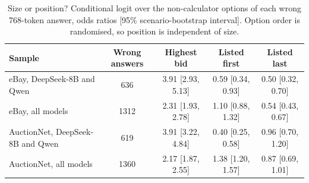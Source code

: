 \begin{table}[t]
\caption{Size or position? Conditional logit over the non-calculator options of each wrong 768-token answer, odds ratios [95\% scenario-bootstrap interval]. Option order is randomised, so position is independent of size.}
\label{tab:possize}
\footnotesize
\centering

\begin{tabular}{lcccc}
\toprule
Sample & Wrong answers & Highest bid & Listed first & Listed last \\
\midrule
eBay, DeepSeek-8B and Qwen & 636 & 3.91 [2.93, 5.13] & 0.59 [0.34, 0.93] & 0.50 [0.32, 0.70] \\
eBay, all models & 1312 & 2.31 [1.93, 2.78] & 1.10 [0.88, 1.32] & 0.54 [0.43, 0.67] \\
AuctionNet, DeepSeek-8B and Qwen & 619 & 3.91 [3.22, 4.84] & 0.40 [0.25, 0.58] & 0.96 [0.70, 1.20] \\
AuctionNet, all models & 1360 & 2.17 [1.87, 2.55] & 1.38 [1.20, 1.57] & 0.87 [0.69, 1.01] \\
\bottomrule
\end{tabular}
\end{table}

